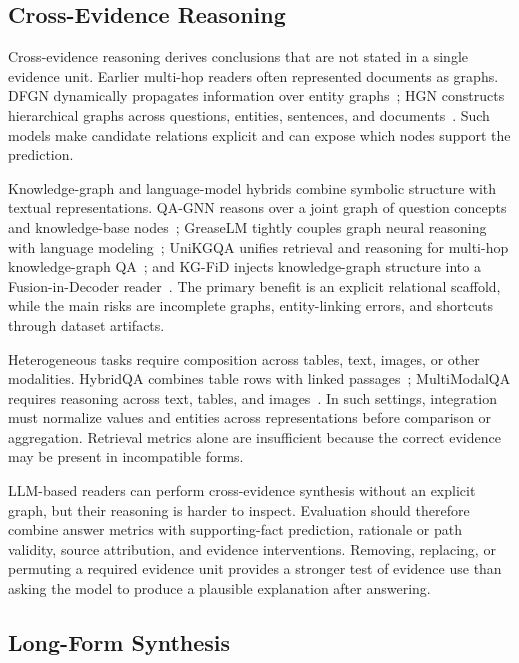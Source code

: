 \subsection{Cross-Evidence Reasoning}
\label{subsec:cross_evidence_reasoning}

Cross-evidence reasoning derives conclusions that are not stated in a single evidence unit. Earlier multi-hop readers often represented documents as graphs. DFGN dynamically propagates information over entity graphs~\cite{qiu2019dfgn}; HGN constructs hierarchical graphs across questions, entities, sentences, and documents~\cite{fang2020hgn}. Such models make candidate relations explicit and can expose which nodes support the prediction.

Knowledge-graph and language-model hybrids combine symbolic structure with textual representations. QA-GNN reasons over a joint graph of question concepts and knowledge-base nodes~\cite{yasunaga2021qagnn}; GreaseLM tightly couples graph neural reasoning with language modeling~\cite{zhang2022greaselm}; UniKGQA unifies retrieval and reasoning for multi-hop knowledge-graph QA~\cite{jiang2023unikgqa}; and KG-FiD injects knowledge-graph structure into a Fusion-in-Decoder reader~\cite{yu2022kgfid}. The primary benefit is an explicit relational scaffold, while the main risks are incomplete graphs, entity-linking errors, and shortcuts through dataset artifacts.

Heterogeneous tasks require composition across tables, text, images, or other modalities. HybridQA combines table rows with linked passages~\cite{chen2020hybridqa}; MultiModalQA requires reasoning across text, tables, and images~\cite{talmor2021multimodalqa}. In such settings, integration must normalize values and entities across representations before comparison or aggregation. Retrieval metrics alone are insufficient because the correct evidence may be present in incompatible forms.

LLM-based readers can perform cross-evidence synthesis without an explicit graph, but their reasoning is harder to inspect. Evaluation should therefore combine answer metrics with supporting-fact prediction, rationale or path validity, source attribution, and evidence interventions. Removing, replacing, or permuting a required evidence unit provides a stronger test of evidence use than asking the model to produce a plausible explanation after answering.

\subsection{Long-Form Synthesis}
\label{subsec:long_form_synthesis}

